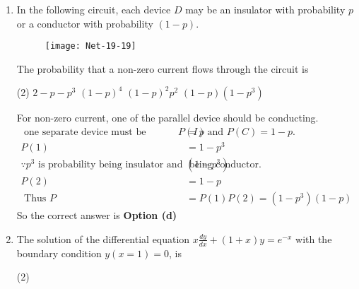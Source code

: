 \begin{enumerate}
\begin{answer}
\begin{align*}
\begin{array}{lll}
	\end{array}\right]\\
	\text { For calculating eigen values }&\left|\begin{array}{ccc}
	1-\lambda & 2 & 3 \\
	2 & 4-\lambda & 6 \\
	3 & 6 & 9-\lambda
	\end{array}\right|=0\\
	(1-\lambda)[(4-\lambda)(9-\lambda)&-36]-2[2(9-\lambda)-18]+3(12-3(4-\lambda))=0\\
	\Rightarrow-\lambda^{3}+\lambda^{2} \cdot &14=0 \Rightarrow \lambda^{2}(-\lambda+14)=0 \quad \Rightarrow \lambda=0,0,14
	\intertext{Also, directly for a $3 \times 3$ matrix we can write $(0,0$, Trace of $\mathrm{A})$ as Eigen values.}
	\end{align*}
		So the correct answer is \textbf{Option (c)}
\end{answer}
\item In the following circuit, each device $D$ may be an insulator with probability $p$ or a conductor with probability $(1-p)$.
\begin{figure}[H]
	\centering
	\texttt{[image: Net-19-19]}
\end{figure}
The probability that a non-zero current flows through the circuit is
 \begin{tasks}(2)
	\task[\textbf{a.}] $2-p-p^{3}$
	\task[\textbf{b.}] $(1-p)^{4}$
	\task[\textbf{c.}] $(1-p)^{2} p^{2}$
	\task[\textbf{d.}] $(1-p)\left(1-p^{3}\right)$
\end{tasks}
\begin{answer}
	For non-zero current, one of the parallel device should be conducting.
	\begin{align*}
	\text { one separate device must be conducting with } P(I)&=p \text { and } P(C)=1-p \text {. }\\
	P(1)&=1-p^{3}\\
	\because p^{3} \text { is probability being insulator and }\left(1-p^{3}\right)& \text { being conductor. }\\
	P(2)&=1-p\\
\text{	Thus }P&=P(1) P(2)=\left(1-p^{3}\right)(1-p)
	\end{align*}
		So the correct answer is \textbf{Option (d)}
\end{answer}
\item The solution of the differential equation $x \frac{d y}{d x}+(1+x) y=e^{-x}$ with the boundary condition $y(x=1)=0$, is
 \begin{tasks}(2)

\end{tasks}
\end{enumerate}
